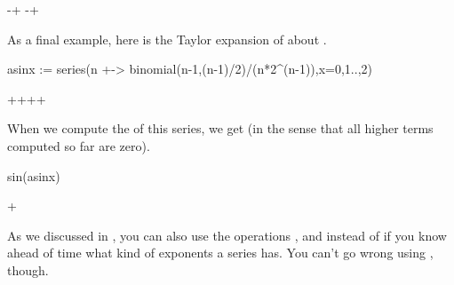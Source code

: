 {{{{{{{{{{{{{{{\begin{xtc}
\begin{TeXOutput}
\begin{fricasmath}{6}
-{\TIMES {}}+\TIMES %
-{\TIMES {}}+%
%
\end{fricasmath}
\end{TeXOutput}
\end{xtc}
%
\begin{xtc}
\begin{xtccomment}
As a final example,
here is the Taylor expansion of  about .
\end{xtccomment}
\begin{spadsrc}
asinx := series(n +-> binomial(n-1,(n-1)/2)/(n*2^(n-1)),x=0,1..,2) 
\end{spadsrc}
\begin{TeXOutput}
\begin{fricasmath}{7}
+\TIMES {}+\TIMES {}+\TIMES {}+%
\end{fricasmath}
\end{TeXOutput}
\end{xtc}
\begin{xtc}
\begin{xtccomment}
When we compute the  of this series, we get 
(in the sense that all higher terms computed so far are zero).
\end{xtccomment}
\begin{spadsrc}
sin(asinx) 
\end{spadsrc}
\begin{TeXOutput}
\begin{fricasmath}{8}
+%
\end{fricasmath}
\end{TeXOutput}
\end{xtc}

As we discussed in ,
you can also use the operations ,  and
 instead of  if you know ahead of time
what kind of exponents a series has.
You can't go wrong using , though.

}}}}}}}}}}}}}}}
